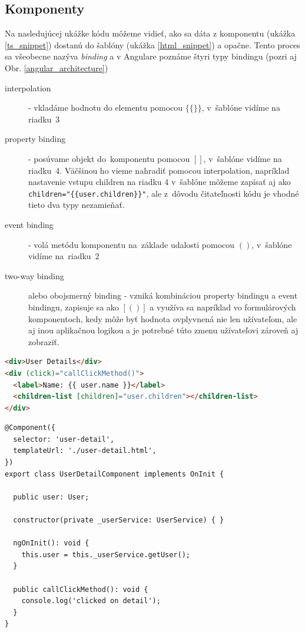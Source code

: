 \documentclass[
  digital, %
  twoside, %
  notable,   %
  nolof,   %
  nolot,   %
]{fithesis3}
\begin{document}
\subsection{Komponenty}
Na nasledujúcej ukážke kódu môžeme vidieť, ako sa dáta z komponentu (ukážka \ref{ts_snippet}) dostanú do šablóny (ukážka \ref{html_snippet}) a opačne. Tento proces sa všeobecne nazýva \textit{binding} a v Angulare poznáme štyri typy bindingu (pozri aj Obr. \ref{angular_architecture})
\begin{description}
\item[interpolation] - vkladáme hodnotu do elementu pomocou $\{\{\}\}$, v~šablóne vidíme na riadku~3
\item[property binding] - posúvame objekt do~komponentu pomocou $[ ]$, v~šablóne vidíme na riadku~4. Väčšinou ho vieme nahradiť pomocou interpolation, napríklad nastavenie vstupu children na riadku 4 v~šablóne môžeme zapísať aj ako\\
\texttt{children="\{\{user.children\}\}"}, ale z~dôvodu čitateľnosti kódu je vhodné tieto dva typy nezamieňať.
\item[event binding] - volá metódu komponentu na~základe udalosti pomocou $()$, v~šablóne vidíme na~riadku~2
\item[two-way binding] alebo obojsmerný binding - vzniká kombináciou property bindingu a event bindingu, zapisuje sa ako $[( )]$ a využíva sa napríklad vo formulárových komponentoch, kedy môže byť hodnota ovplyvnená nie len užívateľom, ale aj inou aplikačnou logikou a je potrebné túto zmenu užívateľovi zároveň aj zobraziť.
\end{description}

\pagebreak

\begin{lstlisting}[language=HTML,caption={HTML šablóna (template) \textit{user-detail.html}},captionpos=b,label=html_snippet]
<div>User Details</div>
<div (click)="callClickMethod()">
  <label>Name: {{ user.name }}</label>
  <children-list [children]="user.children"></children-list>
</div>
\end{lstlisting}

\begin{lstlisting}[caption={Komponent UserDetail},captionpos=b,label=ts_snippet]
@Component({
  selector: 'user-detail',
  templateUrl: './user-detail.html',
})
export class UserDetailComponent implements OnInit {

  public user: User;

  constructor(private _userService: UserService) { }

  ngOnInit(): void {
    this.user = this._userService.getUser();
  }
  
  public callClickMethod(): void {
    console.log('clicked on detail');
  }
}
\end{lstlisting}
\end{document}
